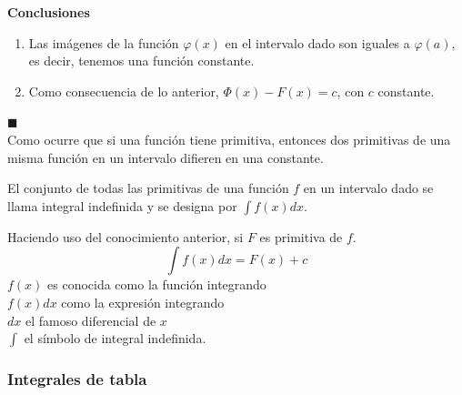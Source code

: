 \documentclass[10pt,twoside]{SelfArx} %
\begin{document}
\textbf{   Conclusiones} 
\begin{enumerate}
\item    Las imágenes de la función $ \varphi(x) $ en el intervalo dado son iguales a $ \varphi(a) $, es decir, tenemos una función constante.
\item 	Como consecuencia de lo anterior, $ \varPhi(x)-F(x)=   c $, con $ c $ constante.
   
   
   
   
   
\end{enumerate}   
$ \blacksquare $\\

Como ocurre que si una función tiene primitiva, entonces dos primitivas de una misma función en un intervalo difieren en una constante.

\begin{thm}
	El conjunto de todas las primitivas de una función $ f $ en un intervalo dado se llama integral indefinida y se designa por $ \int f(x)dx $.
\end{thm}
   Haciendo uso del conocimiento anterior, si $ F $ es primitiva de $ f $.
   \[ \int f(x)dx=F(x)+c \]
   $ f(x) $ es conocida como la función integrando\\
   $ f(x)dx $ como la expresión integrando\\
   $ dx $ el famoso diferencial de $ x $\\
   $ \int $ el símbolo de integral indefinida.\\
   
   
   
   \subsubsection{Integrales de tabla}
   
\end{document}
